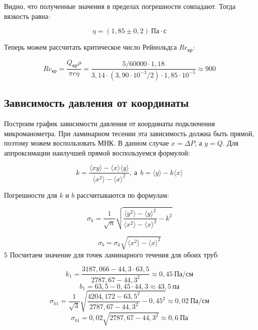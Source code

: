 \documentclass[a4paper,12pt]{article}
\begin{document}
Видно, что полученные значения в пределах погрешности совпадают. Тогда вязкость равна:

\begin{equation}
    \eta = (1,85 \pm 0,2) \ \text{Па} \cdot \text{с}
\end{equation}

Теперь можем рассчитать критическое число Рейнольдса $Re_\text{кр}$:

\begin{equation*}
    Re_\text{кр} = \frac{Q_\text{кр} \rho}{\pi r \eta} = \frac{5 / 60000 \cdot 1,18}{3,14 \cdot (3,90 \cdot 10^{-3} / 2) \cdot 1,85 \cdot 10^{-5}} \approx 900
\end{equation*}

\subsection{Зависимость давления от координаты}

Построим график зависимости давления от координаты подключения микроманометра. При ламинарном тесении эта зависимость должна быть прямой, поэтому можем воспользовать МНК. В данном случае $x = \Delta P$, а $y = Q$. Для аппроксимации наилучшей прямой воспользуемся формулой:

\begin{equation}\label{eq:mnk}
    k = \frac{\langle xy\rangle - \langle x \rangle \langle y \rangle}{\langle x^2 \rangle - \langle x \rangle^2},
    \ \text{а} \ \  b = \langle y \rangle - k\langle x \rangle
\end{equation}

Погрешности для $k$ и $b$ рассчитываются по формулам:

\begin{equation}
    \sigma_k = \frac{1}{\sqrt{n}} \sqrt{\frac{\langle y^2 \rangle - \langle y \rangle^2}{\langle x^2 \rangle - \langle x \rangle^2} - k^2}
\end{equation}

\begin{equation}
    \sigma_b = \sigma_k\sqrt{\langle x^2 \rangle - \langle x \rangle^2}
\end{equation}
5
Посчитаем значение для точек ламинарного течения для обоих труб:

\begin{equation*}
    k_1 = \frac{3187,066 - 44,3 \cdot 63,5}{2787,67 - {44,3}^2} \approx 0,45 \ \text{Па}/\text{см}
\end{equation*}
\begin{equation*}
    b_1 = 63,5 - 0,45 \cdot 44,3 \approx 43,5 \ \text{па}
\end{equation*}
\begin{equation*}
    \sigma_{k1} = \frac{1}{\sqrt{3}} \sqrt{\frac{4204,172 - {63,5}^2}{2787,67 - {44,3}^2} - {0,45}^2} \approx 0,02 \ \text{Па}/\text{см}
\end{equation*}
\begin{equation*}
    \sigma_{b1} = 0,02 \sqrt{2787,67 - {44,3}^2} \approx 0,6 \ \text{Па}
\end{equation*}
\end{document}
